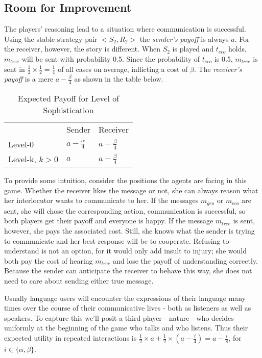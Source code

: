 \documentclass[10pt,a4paper]{article}
\begin{document}
\subsection{Room for Improvement}
The players' reasoning lead to a situation where communication is successful. Using the stable strategy pair $<S_2,R_2>$ the \textit{sender's payoff} is always $a$. For the receiver, however, the story is different. When $S_2$ is played and $t_{eco}$ holds, $m_{tree}$ will be sent with probability 0.5. Since the probability of $t_{eco}$ is 0.5, $m_{tree}$ is sent in $\tfrac{1}{2}\times \tfrac{1}{2} = \tfrac{1}{4}$ of all cases on average, inflicting a cost of $\beta$. The \textit{receiver's payoff} is a mere $a-\tfrac{\beta}{4}$ as shown in the table below.

\begin{table}[h]
\centering
\caption{Expected Payoff for Level of Sophistication}
\begin{tabular}{lll}
                                    & Sender                                  & Receiver                                \\ \cline{2-3}
\multicolumn{1}{l|}{Level-0}        & \multicolumn{1}{l|}{$a-\tfrac{\alpha}{4}$} & \multicolumn{1}{l|}{$a-\tfrac{\beta}{4}$} \\ \cline{2-3}
\multicolumn{1}{l|}{Level-k, $k>0$} & \multicolumn{1}{l|}{$a$}                  & \multicolumn{1}{l|}{$a-\tfrac{\beta}{4}$} \\ \cline{2-3}
\end{tabular}
\end{table}
To provide some intuition, consider the positions the agents are facing in this game. Whether the receiver likes the message or not, she can always reason what her interlocutor wants to communicate to her. If the messages $m_{geo}$ or $m_{eco}$ are sent, she will chose the corresponding action, communication is successful, so both players get their payoff and everyone is happy. If the message $m_{tree}$ is sent, however, she pays the associated cost. Still, she knows what the sender is trying to communicate and her best response will be to cooperate. Refusing to understand is not an option, for it would only add insult to injury; she would both pay the cost of hearing $m_{tree}$ and lose the payoff of understanding correctly. Because the sender can anticipate the receiver to behave this way, she does not need to care about sending either true message.

Usually language users will encounter the expressions of their language many times over the course of their communicative lives - both as listeners as well as speakers. To capture this we'll posit a third player - nature - who decides uniformly at the beginning of the game who talks and who listens. Thus their expected utility in repeated interactions is $\tfrac{1}{2}\times a + \tfrac{1}{2}\times (a-\tfrac{i}{4})=a-\tfrac{i}{8}$, for $i\in \{\alpha,\beta \}$.
\end{document}
